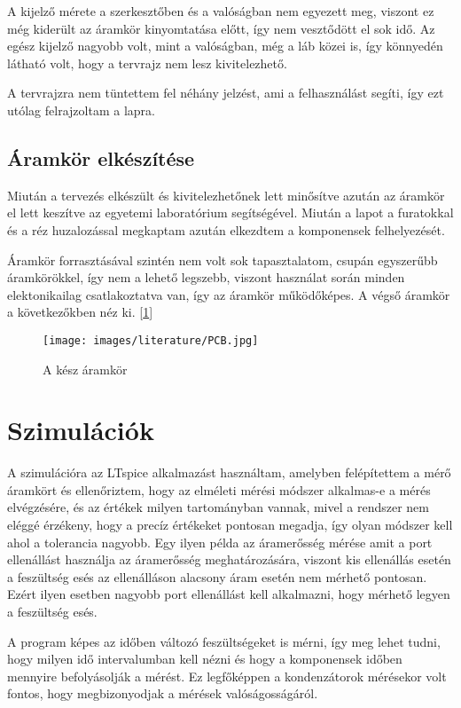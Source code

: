 A kijelző mérete a szerkesztőben és a valóságban nem egyezett meg, viszont ez még 
kiderült az áramkör kinyomtatása előtt, így nem vesztődött el sok idő. Az egész
kijelző nagyobb volt, mint a valóságban, még a láb közei is, így könnyedén látható
volt, hogy a tervrajz nem lesz kivitelezhető.

A tervrajzra nem tüntettem fel néhány jelzést, ami a felhasználást segíti, így ezt 
utólag felrajzoltam a lapra.

\subsection{Áramkör elkészítése}

Miután a tervezés elkészült és kivitelezhetőnek lett minősítve azután az áramkör
el lett keszítve az egyetemi laboratórium segítségével. Miután a lapot a furatokkal és a réz
huzalozással megkaptam azután elkezdtem a komponensek felhelyezését.

Áramkör forrasztásával szintén nem volt sok tapasztalatom, csupán egyszerűbb
áramkörökkel, így nem a lehető legszebb, viszont használat során minden elektonikailag
csatlakoztatva van, így az áramkör működőképes. A végső áramkör a következőkben néz ki.
[\ref{fig:Aramkor}]


\begin{figure}[h]
    \centering
    \texttt{[image: images/literature/PCB.jpg]}
    \caption{A kész áramkör}
    \label{fig:Aramkor}
\end{figure}

\section{Szimulációk}

A szimulációra az LTspice \cite{LTspice} alkalmazást használtam, 
amelyben felépítettem a mérő áramkört és ellenőriztem, hogy az elméleti
mérési módszer alkalmas-e a mérés elvégzésére, és az értékek milyen
tartományban vannak, mivel a rendszer nem eléggé érzékeny, hogy a precíz
értékeket pontosan megadja, így olyan módszer kell ahol a tolerancia nagyobb.
Egy ilyen példa az áramerősség mérése amit a port ellenállást használja az
áramerősség meghatározására, viszont kis ellenállás esetén a
feszültség esés az ellenálláson alacsony áram esetén nem mérhető pontosan.
Ezért ilyen esetben nagyobb port ellenállást kell alkalmazni, hogy mérhető 
legyen a feszültség esés.

A program képes az időben változó feszültségeket is mérni, így
meg lehet tudni, hogy milyen idő intervalumban kell nézni és hogy
a komponensek időben mennyire befolyásolják a mérést. Ez 
legfőképpen a kondenzátorok mérésekor volt fontos, hogy megbizonyodjak
a mérések valóságosságáról.

